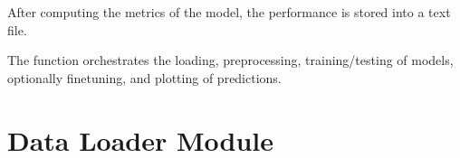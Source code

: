 \documentclass[letterpaper,10pt,english]{sphinxmanual}
\begin{document}
\sphinxAtStartPar
After computing the metrics of the model, the performance is stored into a text file.

\sphinxAtStartPar
The  function orchestrates the loading, preprocessing, training/testing of models, optionally fine\sphinxhyphen{}tuning, and plotting of predictions.

\sphinxstepscope


\section{Data Loader Module}
\label{\detokenize{docs/data_loader:data-loader-module}}\label{\detokenize{docs/data_loader::doc}}\label{\detokenize{docs/data_loader:module-data_loader}}
\end{document}
